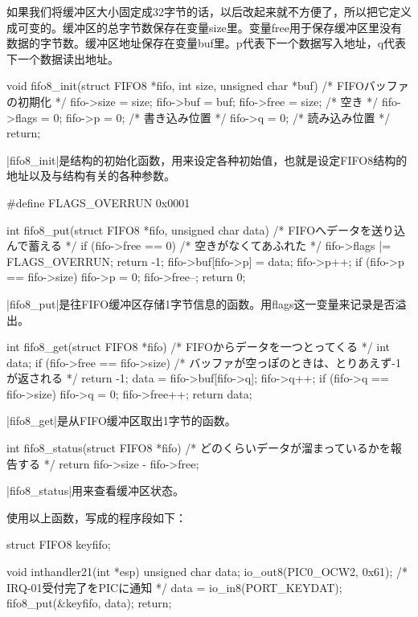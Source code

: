 如果我们将缓冲区大小固定成32字节的话，以后改起来就不方便了，所以把它定义成可变的。缓冲区的总字节数保存在变量size里。变量free用于保存缓冲区里没有数据的字节数。缓冲区地址保存在变量buf里。p代表下一个数据写入地址，q代表下一个数据读出地址。
\begin{code}
void fifo8_init(struct FIFO8 *fifo, int size, unsigned char *buf)
/* FIFOバッファの初期化 */
{
	fifo->size = size;
	fifo->buf = buf;
	fifo->free = size; /* 空き */
	fifo->flags = 0;
	fifo->p = 0; /* 書き込み位置 */
	fifo->q = 0; /* 読み込み位置 */
	return;
}
\end{code}

|fifo8_init|是结构的初始化函数，用来设定各种初始值，也就是设定FIFO8结构的地址以及与结构有关的各种参数。

\begin{code}
#define FLAGS_OVERRUN		0x0001

int fifo8_put(struct FIFO8 *fifo, unsigned char data)
/* FIFOへデータを送り込んで蓄える */
{
	if (fifo->free == 0) {
		/* 空きがなくてあふれた */
		fifo->flags |= FLAGS_OVERRUN;
		return -1;
	}
	fifo->buf[fifo->p] = data;
	fifo->p++;
	if (fifo->p == fifo->size) {
		fifo->p = 0;
	}
	fifo->free--;
	return 0;
}
\end{code}

|fifo8_put|是往FIFO缓冲区存储1字节信息的函数。用flags这一变量来记录是否溢出。

\begin{code}
int fifo8_get(struct FIFO8 *fifo)
/* FIFOからデータを一つとってくる */
{
	int data;
	if (fifo->free == fifo->size) {
		/* バッファが空っぽのときは、とりあえず-1が返される */
		return -1;
	}
	data = fifo->buf[fifo->q];
	fifo->q++;
	if (fifo->q == fifo->size) {
		fifo->q = 0;
	}
	fifo->free++;
	return data;
}
\end{code}

|fifo8_get|是从FIFO缓冲区取出1字节的函数。
\begin{code}
int fifo8_status(struct FIFO8 *fifo)
/* どのくらいデータが溜まっているかを報告する */
{
	return fifo->size - fifo->free;
}
\end{code}

|fifo8_status|用来查看缓冲区状态。

使用以上函数，写成的程序段如下：
\begin{code}
struct FIFO8 keyfifo;

void inthandler21(int *esp)
{
	unsigned char data;
	io_out8(PIC0_OCW2, 0x61);	/* IRQ-01受付完了をPICに通知 */
	data = io_in8(PORT_KEYDAT);
	fifo8_put(&keyfifo, data);
	return;
}
\end{code}

